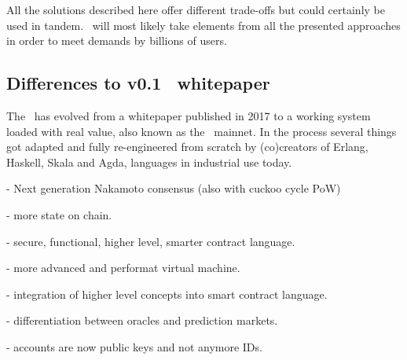 All the solutions described here offer different trade-offs but could certainly
be used in tandem. \aet\ will most likely take elements from all the presented
approaches in order to meet demands by billions of users.



\subsection{Differences to v0.1 \blockchain\ whitepaper}
The \blockchain\ has evolved from a whitepaper published in 2017 to a working system loaded with real value, also known as the \aet\ mainnet. In the process several things got adapted and fully re-engineered from scratch by (co)creators of Erlang, Haskell, Skala and Agda, languages in industrial use today. 

- Next generation Nakamoto consensus (also with cuckoo cycle PoW)

- more state on chain.

- secure, functional, higher level, smarter contract language.

- more advanced and performat virtual machine.

- integration of higher level concepts into smart contract language.

- differentiation between oracles and prediction markets.

- accounts are now public keys and not anymore IDs.

